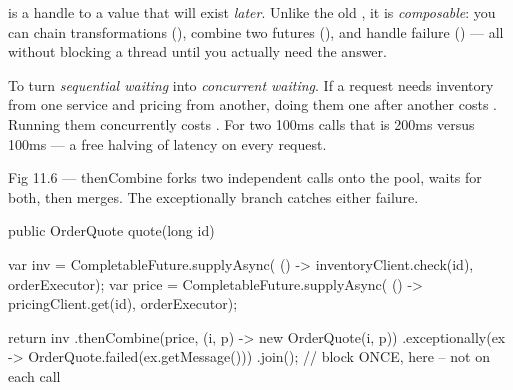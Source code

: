 
  is a handle to a value that will exist \emph{later}. Unlike the old , it is \emph{composable}: you can chain transformations (), combine two futures (), and handle failure () --- all without blocking a thread until you actually need the answer.

 To turn \emph{sequential waiting} into \emph{concurrent waiting}. If a request needs inventory from one service and pricing from another, doing them one after another costs . Running them concurrently costs . For two 100ms calls that is 200ms versus 100ms --- a free halving of latency on every request.

\begin{wbfigure}{Fig 11.6 --- thenCombine forks two independent calls onto the pool, waits for both, then merges. The exceptionally branch catches either failure.}
\end{wbfigure}

\begin{javabox}
public OrderQuote quote(long id) {
  var inv = CompletableFuture.supplyAsync(
      () -> inventoryClient.check(id), orderExecutor);
  var price = CompletableFuture.supplyAsync(
      () -> pricingClient.get(id), orderExecutor);

  return inv
      .thenCombine(price, (i, p) -> new OrderQuote(i, p))
      .exceptionally(ex -> OrderQuote.failed(ex.getMessage()))
      .join();   // block ONCE, here -- not on each call
}
\end{javabox}

